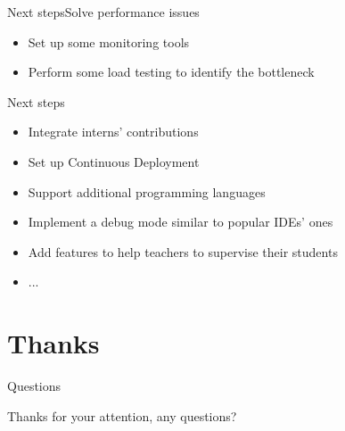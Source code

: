 \documentclass{beamer}
\begin{document}
\begin{frame}{Next steps}{Solve performance issues}
  \begin{itemize}
  \item {
    Set up some monitoring tools
  }
  \item {
    Perform some load testing to identify the bottleneck
  }
  \end{itemize}
\end{frame}

\begin{frame}{Next steps}{}
  \begin{itemize}
  \item Integrate interns' contributions
  \item Set up Continuous Deployment
  \item Support additional programming languages
  \item Implement a debug mode similar to popular IDEs' ones
  \item Add features to help teachers to supervise their students
  \item ...
  \end{itemize}
\end{frame}

\section*{Thanks}

\begin{frame}{Questions}
  \begin{center}
    Thanks for your attention, any questions?
  \end{center}
\end{frame}
\end{document}
